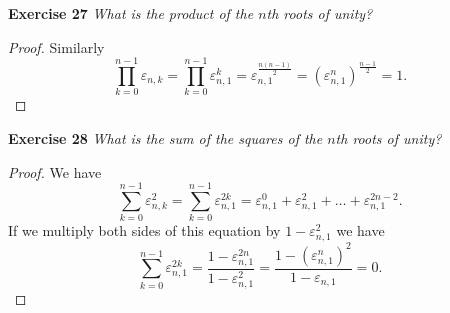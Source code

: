 \documentclass{article}
\begin{document}
\begin{flushleft}
\textbf{Exercise 27}
\textsl{What is the product of the $n$th roots of unity?}
\begin{proof}
Similarly
\[
\prod_{k=0}^{n-1} \varepsilon_{n,k} = \prod_{k=0}^{n-1} \varepsilon_{n,1}^k = \varepsilon_{n,1}^{\frac{n(n-1)}{2}} = \left ( \varepsilon_{n,1}^n \right )^{\frac{n-1}{2}} = 1.
\]
\end{proof}

\textbf{Exercise 28}
\textsl{What is the sum of the squares of the $n$th roots of unity?}
\begin{proof}
We have
\[
\sum_{k=0}^{n-1} \varepsilon_{n,k}^2 = \sum_{k=0}^{n-1} \varepsilon_{n,1}^{2k} = \varepsilon_{n,1}^0 + \varepsilon_{n,1}^2 + \dots + \varepsilon_{n,1}^{2n-2}.
\]
If we multiply both sides of this equation by $1-\varepsilon_{n,1}^2$ we have
\[
\sum_{k=0}^{n-1} \varepsilon_{n,1}^{2k} = \frac{1-\varepsilon_{n,1}^{2n}}{1-\varepsilon_{n,1}^2} = \frac{1 - \left ( \varepsilon_{n,1}^n \right )^2}{1 - \varepsilon_{n,1}} = 0.
\]
\end{proof}

\end{flushleft}
\end{document}
